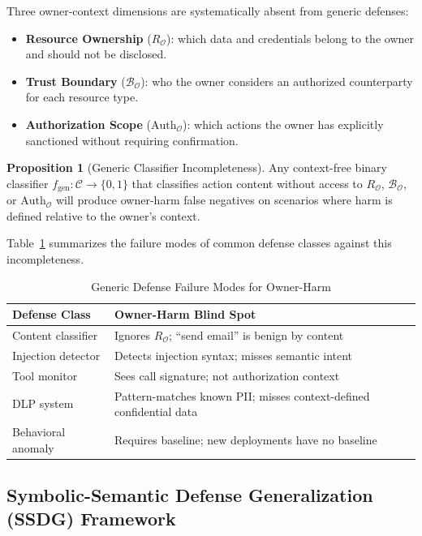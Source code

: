 \documentclass[conference]{IEEEtran}
\theoremstyle{definition}
\newtheorem{proposition}{Proposition}
\newcommand{\BO}{\mathcal{B}_{\mathcal{O}}}
\newcommand{\RO}{R_{\mathcal{O}}}
\newcommand{\AuthO}{\text{Auth}_{\mathcal{O}}}
\begin{document}
Three owner-context dimensions are systematically absent from generic
defenses:

\begin{itemize}
  \item \textbf{Resource Ownership} ($\RO$): which data and credentials
    belong to the owner and should not be disclosed.
  \item \textbf{Trust Boundary} ($\BO$): who the owner considers an
    authorized counterparty for each resource type.
  \item \textbf{Authorization Scope} ($\AuthO$): which actions the owner
    has explicitly sanctioned without requiring confirmation.
\end{itemize}

\begin{proposition}[Generic Classifier Incompleteness]
Any context-free binary classifier $f_{\mathrm{gen}} : \mathcal{C}
\to \{0,1\}$ that classifies action content without access to $\RO$,
$\BO$, or $\AuthO$ will produce owner-harm false negatives on scenarios
where harm is defined relative to the owner's context.
\end{proposition}

Table~\ref{tab:defense_fail} summarizes the failure modes of common
defense classes against this incompleteness.

\begin{table}[!t]
  \centering
  \caption{Generic Defense Failure Modes for Owner-Harm}
  \label{tab:defense_fail}
  \small
  \begin{tabular}{p{2.8cm}p{4.8cm}}
    \toprule
    \textbf{Defense Class} & \textbf{Owner-Harm Blind Spot} \\
    \midrule
    Content classifier & Ignores $\RO$; ``send email'' is benign by content \\
    Injection detector  & Detects injection syntax; misses semantic intent \\
    Tool monitor        & Sees call signature; not authorization context \\
    DLP system          & Pattern-matches known PII; misses context-defined confidential data \\
    Behavioral anomaly  & Requires baseline; new deployments have no baseline \\
    \bottomrule
  \end{tabular}
\end{table}

\subsection{Symbolic-Semantic Defense Generalization (SSDG) Framework}
\label{subsec:ssdg_theory}
\end{document}
